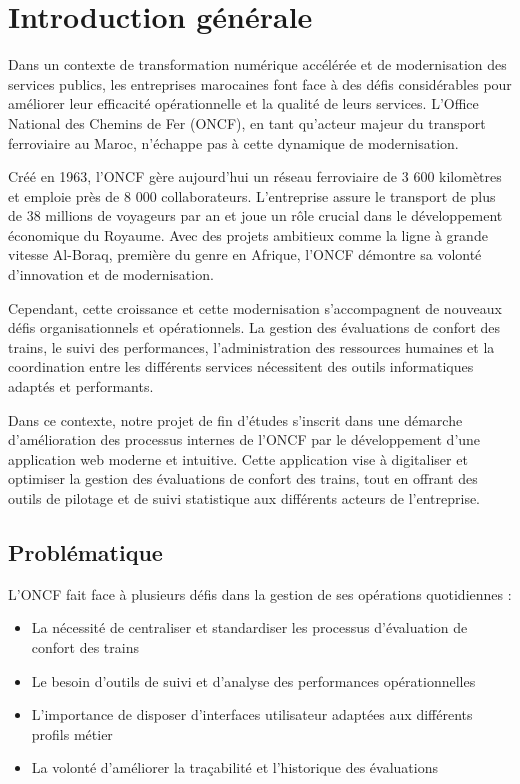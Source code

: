 \chapter*{Introduction générale}

Dans un contexte de transformation numérique accélérée et de modernisation des services publics, les entreprises marocaines font face à des défis considérables pour améliorer leur efficacité opérationnelle et la qualité de leurs services. L'Office National des Chemins de Fer (ONCF), en tant qu'acteur majeur du transport ferroviaire au Maroc, n'échappe pas à cette dynamique de modernisation.

Créé en 1963, l'ONCF gère aujourd'hui un réseau ferroviaire de 3 600 kilomètres et emploie près de 8 000 collaborateurs. L'entreprise assure le transport de plus de 38 millions de voyageurs par an et joue un rôle crucial dans le développement économique du Royaume. Avec des projets ambitieux comme la ligne à grande vitesse Al-Boraq, première du genre en Afrique, l'ONCF démontre sa volonté d'innovation et de modernisation.

Cependant, cette croissance et cette modernisation s'accompagnent de nouveaux défis organisationnels et opérationnels. La gestion des évaluations de confort des trains, le suivi des performances, l'administration des ressources humaines et la coordination entre les différents services nécessitent des outils informatiques adaptés et performants.

Dans ce contexte, notre projet de fin d'études s'inscrit dans une démarche d'amélioration des processus internes de l'ONCF par le développement d'une application web moderne et intuitive. Cette application vise à digitaliser et optimiser la gestion des évaluations de confort des trains, tout en offrant des outils de pilotage et de suivi statistique aux différents acteurs de l'entreprise.

\section*{Problématique}

L'ONCF fait face à plusieurs défis dans la gestion de ses opérations quotidiennes :
\begin{itemize}
    \item La nécessité de centraliser et standardiser les processus d'évaluation de confort des trains
    \item Le besoin d'outils de suivi et d'analyse des performances opérationnelles
    \item L'importance de disposer d'interfaces utilisateur adaptées aux différents profils métier
    \item La volonté d'améliorer la traçabilité et l'historique des évaluations
\end{itemize}

